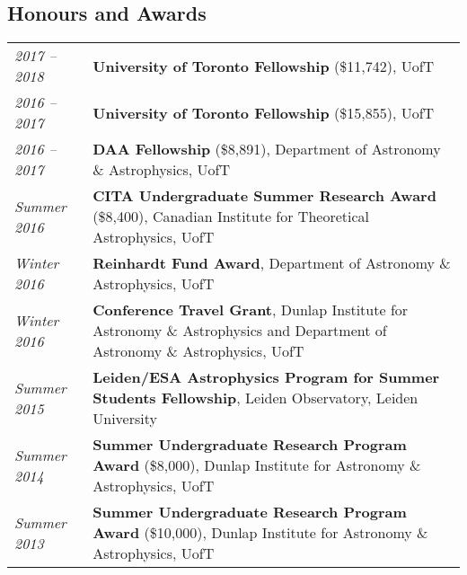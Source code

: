 \documentclass[10pt]{res} %
\begin{document}
\begin{resume}

\section{\Large Honours and Awards}
\vspace{-5pt} %
\noindent\makebox[\linewidth]{\rule{\textwidth}{0.4pt}}
\vspace{-20pt} %

\begin{table}[h]
\begin{tabularx}{\textwidth}{lX}
\textit{2017 -- 2018} & \textbf{University of Toronto Fellowship} (\$11,742), UofT \\
\textit{2016 -- 2017} & \textbf{University of Toronto Fellowship} (\$15,855), UofT \\
\textit{2016 -- 2017} & \textbf{DAA Fellowship} (\$8,891), Department of Astronomy \& Astrophysics, UofT \\
\textit{Summer 2016} & \textbf{CITA Undergraduate Summer Research Award} (\$8,400), Canadian Institute for Theoretical Astrophysics, UofT \\
\textit{Winter 2016} & \textbf{Reinhardt Fund Award}, Department of Astronomy \& Astrophysics, UofT \\
\textit{Winter 2016} & \textbf{Conference Travel Grant}, Dunlap Institute for Astronomy \& Astrophysics and Department of Astronomy \& Astrophysics, UofT \\
\textit{Summer 2015} & \textbf{Leiden/ESA Astrophysics Program for Summer Students Fellowship}, Leiden Observatory, Leiden University \\
\textit{Summer 2014} & \textbf{Summer Undergraduate Research Program Award} (\$8,000), Dunlap Institute for Astronomy \& Astrophysics, UofT \\
\textit{Summer 2013} & \textbf{Summer Undergraduate Research Program Award} (\$10,000), Dunlap Institute for Astronomy \& Astrophysics, UofT 
\end{tabularx}
\end{table}



\end{resume}
\end{document}

